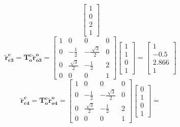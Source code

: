 \documentclass[12pt, letterpaper]{article}
\begin{document}
\begin{enumerate}
\begin{equation*}
\begin{bmatrix}
                    1\\
                    0\\
                    2\\
                    1
                \end{bmatrix}
        \end{equation*}
        \begin{equation*}
            \bm{\tilde{r}^c_{c3}=T_o^c\tilde{r}^{o}_{o3}}=
            \begin{bmatrix}
                1 & 0 & 0 & 0\\
                0 & -\frac{1}{2} & -\frac{\sqrt[]{3}}{2} & 0\\
                0 & \frac{\sqrt[]{3}}{2} & -\frac{1}{2} & 2\\
                0 & 0 & 0 & 1
            \end{bmatrix}
                \begin{bmatrix}
                    1\\
                    1\\
                    0\\
                    1
                \end{bmatrix}=
                \begin{bmatrix}
                    1\\
                    -0.5\\
                    2.866\\
                    1
                \end{bmatrix}
        \end{equation*}
        \begin{equation*}
            \bm{\tilde{r}^c_{c4}=T_o^c\tilde{r}^{o}_{o4}}=
            \begin{bmatrix}
                1 & 0 & 0 & 0\\
                0 & -\frac{1}{2} & -\frac{\sqrt[]{3}}{2} & 0\\
                0 & \frac{\sqrt[]{3}}{2} & -\frac{1}{2} & 2\\
                0 & 0 & 0 & 1
            \end{bmatrix}
                \begin{bmatrix}
                    0\\
                    1\\
                    0\\
                    1
                \end{bmatrix}=

\end{equation*}
\end{enumerate}
\end{document}
